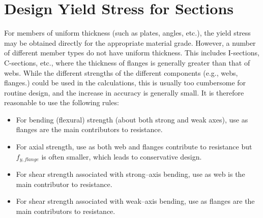 \section{Design Yield Stress for Sections}\label{sec:ys}
For members of uniform thickness (such as plates, angles, etc.), the yield stress may be obtained directly for the appropriate material grade. However, a number of different member types do not have uniform thickness. This includes I-sections, C-sections, etc., where the thickness of flanges is generally greater than that of webs. While the different strengths of the different components (e.g., webs, flanges.) could be used in the calculations, this is usually too cumbersome for routine design, and the increase in accuracy is generally small. It is therefore reasonable to use the following rules:
\begin{itemize}
\item For bending (flexural) strength (about both strong and weak axes), use  as flanges are the main contributors to resistance.
\begin{figure}[H]
\centering

\end{figure}
\item For axial strength, use  as both web and flanges contribute to resistance but $f_{y,flange}$ is often smaller, which leads to conservative design.
\begin{figure}[H]
\centering

\end{figure}
\item For shear strength associated with strong--axis bending, use  as web is the main contributor to resistance.
\begin{figure}[H]
\centering

\end{figure}
\item For shear strength associated with weak--axis bending, use  as flanges are the main contributors to resistance.
\begin{figure}[H]
\centering

\end{figure}
\end{itemize}
